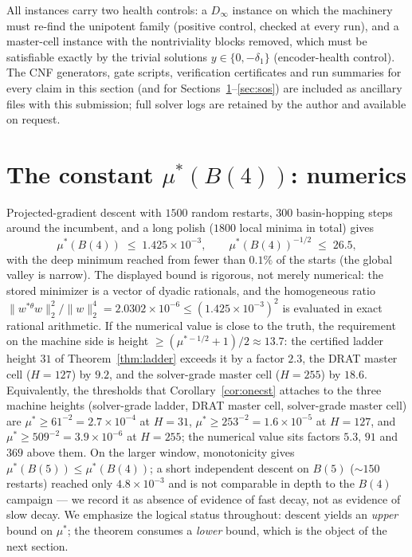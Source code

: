 \documentclass[11pt]{article}
\newcommand{\thst}{{*\theta}}
\begin{document}
All instances carry two health controls: a $D_\infty$ instance on
which the machinery must re-find the unipotent family (positive
control, checked at every run), and a master-cell instance with the
nontriviality blocks removed, which must be satisfiable exactly by the
trivial solutions $y\in\{0,-\delta_1\}$ (encoder-health control).
The CNF generators, gate scripts, verification certificates and run
summaries for every claim in this section (and for
Sections~\ref{sec:mu}--\ref{sec:sos}) are included as ancillary files
with this submission; full solver logs are retained by the author and
available on request.

\section{The constant $\mu^*(B(4))$: numerics}\label{sec:mu}

Projected-gradient descent with $1500$ random restarts, $300$
basin-hopping steps around the incumbent, and a long polish ($1800$
local minima in total) gives
\[
\mu^*(B(4))\;\le\;1.425\times10^{-3},\qquad
\mu^*(B(4))^{-1/2}\;\le\;26.5,
\]
with the deep minimum reached from fewer than $0.1\%$ of the starts
(the global valley is narrow).  The displayed bound is rigorous, not
merely numerical: the stored minimizer is a vector of dyadic
rationals, and the homogeneous ratio
$\|w^{\thst}w\|_2^2/\|w\|_2^4=2.0302\times10^{-6}\le(1.425\times
10^{-3})^2$ is evaluated in exact rational arithmetic.  If the numerical value is close to the
truth, the requirement on the machine side is height
$\ge(\mu^{*-1/2}+1)/2\approx 13.7$: the certified ladder height $31$
of Theorem~\ref{thm:ladder} exceeds it by a factor $2.3$, the DRAT
master cell ($H=127$) by $9.2$, and the solver-grade master cell
($H=255$) by $18.6$.  Equivalently, the thresholds that
Corollary~\ref{cor:onecst} attaches to the three machine heights
(solver-grade ladder, DRAT master cell, solver-grade master cell) are
$\mu^*\ge 61^{-2}=2.7\times10^{-4}$ at $H=31$,
$\mu^*\ge 253^{-2}=1.6\times10^{-5}$ at $H=127$, and
$\mu^*\ge 509^{-2}=3.9\times10^{-6}$ at $H=255$; the numerical value
sits factors $5.3$, $91$ and $369$ above them.  On the larger window, monotonicity gives
$\mu^*(B(5))\le\mu^*(B(4))$; a short independent descent on $B(5)$
($\sim150$ restarts) reached only $4.8\times10^{-3}$ and is not
comparable in depth to the $B(4)$ campaign --- we record it as absence
of evidence of fast decay, not as evidence of slow decay.  We
emphasize the logical status throughout: descent yields an
\emph{upper} bound on $\mu^*$; the theorem consumes a \emph{lower}
bound, which is the object of the next section.
\end{document}
